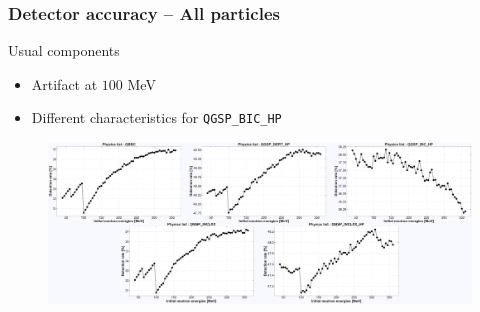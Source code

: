 \begin{frame}
\frametitle{Detector accuracy -- All particles}

\begin{block}{Usual components}
	\begin{itemize}
		\item Artifact at $100$ MeV
		\item Different characteristics for \texttt{QGSP\_BIC\_HP}
	\end{itemize}
\end{block}

\begin{figure}
	\includegraphics[width=\textwidth]{images/detection_rates.pdf}
\end{figure}


\end{frame}